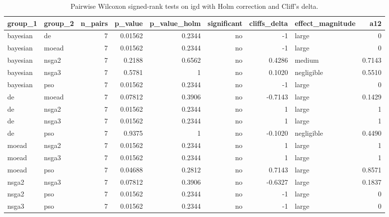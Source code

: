 \begin{table}[!t]
\centering
\caption{Pairwise Wilcoxon signed-rank tests on igd with Holm correction and Cliff's delta.}
\label{tab:statistics_optimizer_pairwise_igd_main}
\footnotesize
\begin{tabular}{llrrrrrlr}
\toprule
group\_1 & group\_2 & n\_pairs & p\_value & p\_value\_holm & significant & cliffs\_delta & effect\_magnitude & a12 \\
\midrule
bayesian & de & 7 & 0.01562 & 0.2344 & no & -1 & large & 0 \\
bayesian & moead & 7 & 0.01562 & 0.2344 & no & -1 & large & 0 \\
bayesian & nsga2 & 7 & 0.2188 & 0.6562 & no & 0.4286 & medium & 0.7143 \\
bayesian & nsga3 & 7 & 0.5781 & 1 & no & 0.1020 & negligible & 0.5510 \\
bayesian & pso & 7 & 0.01562 & 0.2344 & no & -1 & large & 0 \\
de & moead & 7 & 0.07812 & 0.3906 & no & -0.7143 & large & 0.1429 \\
de & nsga2 & 7 & 0.01562 & 0.2344 & no & 1 & large & 1 \\
de & nsga3 & 7 & 0.01562 & 0.2344 & no & 1 & large & 1 \\
de & pso & 7 & 0.9375 & 1 & no & -0.1020 & negligible & 0.4490 \\
moead & nsga2 & 7 & 0.01562 & 0.2344 & no & 1 & large & 1 \\
moead & nsga3 & 7 & 0.01562 & 0.2344 & no & 1 & large & 1 \\
moead & pso & 7 & 0.04688 & 0.2812 & no & 0.7143 & large & 0.8571 \\
nsga2 & nsga3 & 7 & 0.07812 & 0.3906 & no & -0.6327 & large & 0.1837 \\
nsga2 & pso & 7 & 0.01562 & 0.2344 & no & -1 & large & 0 \\
nsga3 & pso & 7 & 0.01562 & 0.2344 & no & -1 & large & 0 \\
\bottomrule
\end{tabular}
\end{table}
